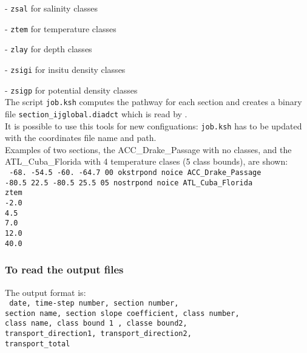 \documentclass[../main/NEMO_manual]{subfiles}
\begin{document}
 - \texttt{zsal}  for          salinity classes

 - \texttt{ztem}  for       temperature classes

 - \texttt{zlay}  for             depth classes

 - \texttt{zsigi} for    insitu density classes

 - \texttt{zsigp} for potential density classes \\

 The script \texttt{job.ksh} computes the pathway for each section and creates a binary file
 \texttt{section\_ijglobal.diadct} which is read by \NEMO. \\

 It is possible to use this tools for new configuations: \texttt{job.ksh} has to be updated with
 the coordinates file name and path. \\

 Examples of two sections, the ACC\_Drake\_Passage with no classes,
 and the ATL\_Cuba\_Florida with 4 temperature clases (5 class bounds), are shown: \\
 \noindent
 {
   \texttt{
     -68.    -54.5   -60.    -64.7  00 okstrpond noice ACC\_Drake\_Passage \\
     -80.5    22.5   -80.5    25.5  05 nostrpond noice ATL\_Cuba\_Florida  \\
     ztem                                                                  \\
     -2.0                                                                  \\
     4.5                                                                  \\
     7.0                                                                  \\
     12.0                                                                  \\
     40.0}
 }

\subsubsection{To read the output files}

The output format is: \\
{
  \texttt{
    date, time-step number, section number,                \\
    section name, section slope coefficient, class number, \\
    class name, class bound 1 , classe bound2,             \\
    transport\_direction1, transport\_direction2,          \\
    transport\_total}
}                                     \\
\end{document}
